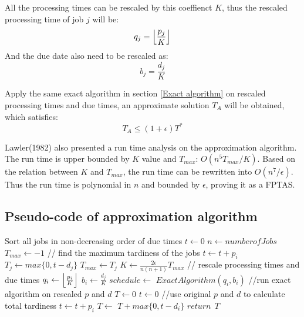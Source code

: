 \documentclass[11pt]{article}
\begin{document}
All the processing times can be rescaled by this coeffienct $K$, thus the rescaled processing time of job $j$ will be:
$$q_j=\Bigl\lfloor \frac{p_j}{K} \Bigr\rfloor $$
And the due date also need to be rescaled as:
$$b_j=\frac{d_j}{K}$$

Apply the same exact algorithm in section \ref{Exact algorithm} on rescaled processing times and due times, an approximate solution $T_A$ will be obtained, which satisfies:
$$T_A \leq (1+\epsilon) T^*$$

Lawler(1982) also presented a run time analysis on the approximation algorithm. The run time is upper bounded by $K$ value and $T_{max}$: $O(n^5T_{max}/K)$. Based on the relation between $K$ and $T_{max}$, the run time can be rewritten into $O(n^7/\epsilon)$. Thus the run time is polynomial in $n$ and bounded by $\epsilon$, proving it as a FPTAS.
\subsection{Pseudo-code of approximation algorithm}

\begin{algorithmic}
\State Sort all jobs in non-decreasing order of due times
\State $t\gets 0$
\State $n\gets number of Jobs$
\State $T_{max}\gets -1$
  // find the maximum tardiness of the jobs
    \State $t \gets t+p_i$
    \State $T_j\gets max\{ 0,t-d_j\}$
    \State $T_{max}\gets T_j$
    \EndIf
\EndFor
\State $K\gets \frac{2\epsilon}{n(n+1)}T_{max}$
 // rescale processing times and due times
    \State $q_i\gets \Bigl\lfloor \frac{p_i}{K} \Bigr\rfloor$
    \State $b_i\gets \frac{d_j}{K}$
\EndFor
\State $schedule \gets$ $ExactAlgorithm(q_i,b_i)$ //run exact algorithm on rescaled $p$ and $d$
\State $T \gets 0$
\State $t\gets 0$
 //use original $p$ and $d$ to calculate total tardiness
	\State $t \gets t+p_i$
    \State $T \gets$ $T+max\{ 0, t-d_i\}$
\EndFor
\State $return\ \ T$
\end{algorithmic}
\end{document}
